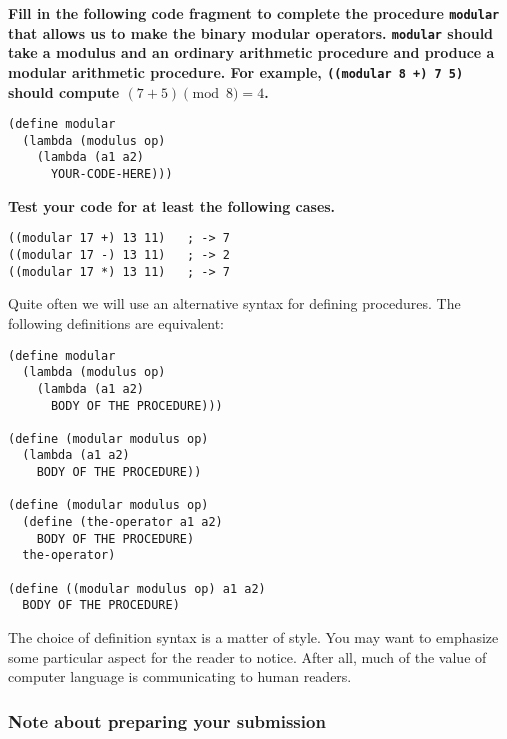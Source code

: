 {\bf Fill in the following code fragment to complete the procedure
{\tt modular} that allows us to make the binary modular operators.
{\tt modular} should take a modulus and an ordinary arithmetic
procedure and produce a modular arithmetic procedure.  For example,
{\tt ((modular 8 +) 7 5)} should compute $(7+5)\pmod{8} = 4$.}
\begin{verbatim}
(define modular
  (lambda (modulus op)
    (lambda (a1 a2)
      YOUR-CODE-HERE)))
\end{verbatim}

{\bf Test your code for at least the following cases.}
\begin{verbatim}
((modular 17 +) 13 11)   ; -> 7
((modular 17 -) 13 11)   ; -> 2
((modular 17 *) 13 11)   ; -> 7
\end{verbatim}

Quite often we will use an alternative syntax for defining procedures.
The following definitions are equivalent:
\begin{verbatim}
(define modular
  (lambda (modulus op)
    (lambda (a1 a2)
      BODY OF THE PROCEDURE)))

(define (modular modulus op)
  (lambda (a1 a2)
    BODY OF THE PROCEDURE))

(define (modular modulus op)
  (define (the-operator a1 a2)
    BODY OF THE PROCEDURE)
  the-operator)

(define ((modular modulus op) a1 a2)
  BODY OF THE PROCEDURE)
\end{verbatim}
The choice of definition syntax is a matter of style.  You may want to
emphasize some particular aspect for the reader to notice.  After all,
much of the value of computer language is communicating to human
readers.


\subsubsection*{Note about preparing your submission}

